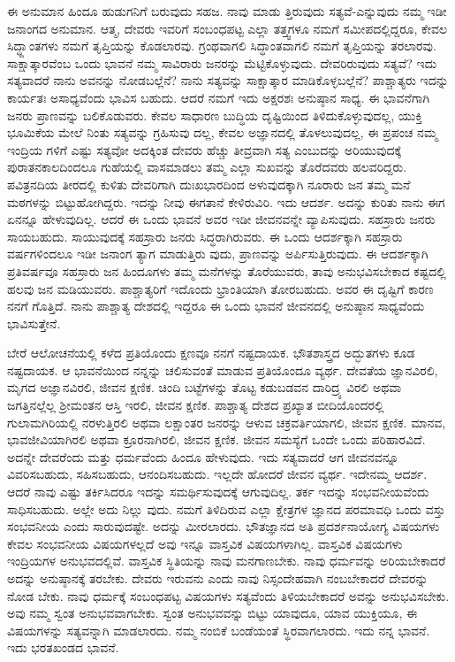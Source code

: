 ಈ ಅನುಮಾನ ಹಿಂದೂ ಹುಡುಗನಿಗೆ ಬರುವುದು ಸಹಜ. ನಾವು ಮಾಡು ತ್ತಿರುವುದು ಸತ್ಯವೆ-ಎನ್ನುವುದು ನಮ್ಮ ಇಡೀ ಜನಾಂಗದ ಅನುಮಾನ. ಆತ್ಮ, ದೇವರು ಇವರಿಗೆ ಸಂಬಂಧಪಟ್ಟ ಎಲ್ಲಾ ತತ್ತ್ವಗಳೂ ನಮಗೆ ಸಮೀಪದಲ್ಲಿದ್ದರೂ, ಕೇವಲ ಸಿದ್ಧ್ದಾಂತಗಳು ನಮಗೆ ತೃಪ್ತಿಯನ್ನು ಕೊಡಲಾರವು. ಗ್ರಂಥವಾಗಲಿ ಸಿದ್ಧಾಂತವಾಗಲಿ ನಮಗೆ ತೃಪ್ತಿಯನ್ನು ತರಲಾರವು. ಸಾಕ್ಷಾತ್ಕಾರವೆಂಬ ಒಂದು ಭಾವನೆ ನಮ್ಮ ಸಾವಿರಾರು ಜನರನ್ನು ಮೆಟ್ಟಿಕೊಳ್ಳುವುದು. ದೇವರಿರುವುದು ಸತ್ಯವೆ? ಇದು ಸತ್ಯವಾದರೆ ನಾನು ಅವನನ್ನು ನೋಡಬಲ್ಲೆನೆ? ನಾನು ಸತ್ಯವನ್ನು ಸಾಕ್ಷಾತ್ಕಾರ ಮಾಡಿಕೊಳ್ಳಬಲ್ಲೆನೆ? ಪಾಶ್ಚಾತ್ಯರು ಇದನ್ನು ಕಾರ್ಯತಃ ಅಸಾಧ್ಯವೆಂದು ಭಾವಿಸ ಬಹುದು. ಆದರೆ ನಮಗೆ ಇದು ಅಕ್ಷರಶಃ ಅನುಷ್ಠಾನ ಸಾಧ್ಯ. ಈ ಭಾವನೆಗಾಗಿ ಜನರು ಪ್ರಾಣವನ್ನು ಬಲಿಕೊಡುವರು. ಕೇವಲ ಸಾಧಾರಣ ಬುದ್ಧಿಯ ದೃಷ್ಟಿಯಿಂದ ತಿಳಿದುಕೊಳ್ಳುವುದಲ್ಲ, ಯುಕ್ತಿ ಭೂಮಿಕೆಯ ಮೇಲೆ ನಿಂತು ಸತ್ಯವನ್ನು ಗ್ರಹಿಸುವು ದಲ್ಲ, ಕೇವಲ ಅಜ್ಞಾನದಲ್ಲಿ ತೊಳಲುವುದಲ್ಲ, ಈ ಪ್ರಪಂಚ ನಮ್ಮ ಇಂದ್ರಿಯ ಗಳಿಗೆ ಎಷ್ಟು ಸತ್ಯವೋ ಅದಕ್ಕಿಂತ ದೇವರು ಹೆಚ್ಚು ತೀವ್ರವಾಗಿ ಸತ್ಯ ಎಂಬುದನ್ನು ಅರಿಯುವುದಕ್ಕೆ ಪುರಾತನಕಾಲದಿಂದಲೂ ಗುಹೆಯಲ್ಲಿ ವಾಸಮಾಡಲು ತಮ್ಮ ಎಲ್ಲಾ ಸುಖವನ್ನು ತೊರೆದವರು ಹಲವರಿದ್ದರು. ಪವಿತ್ರನದಿಯ ತೀರದಲ್ಲಿ ಕುಳಿತು ದೇವರಿಗಾಗಿ ದುಃಖಭಾರದಿಂದ ಅಳುವುದಕ್ಕಾಗಿ ನೂರಾರು ಜನ ತಮ್ಮ ಮನೆ ಮಠಗಳನ್ನು ಬಿಟ್ಟುಹೋಗಿದ್ದರು. ಇದನ್ನು ನೀವು ಈಗತಾನೆ ಕೇಳಿರುವಿರಿ. ಇದು ಆದರ್ಶ. ಅದನ್ನು ಕುರಿತು ನಾನು ಈಗ ಏನನ್ನೂ ಹೇಳುವುದಿಲ್ಲ. ಆದರೆ ಈ ಒಂದು ಭಾವನೆ ಅವರ ಇಡೀ ಜೀವನವನ್ನೇ ವ್ಯಾಪಿಸುವುದು. ಸಹಸ್ರಾರು ಜನರು ಸಾಯಬಹುದು. ಸಾಯುವುದಕ್ಕೆ ಸಹಸ್ರಾರು ಜನರು ಸಿದ್ಧರಾಗಿರುವರು. ಈ ಒಂದು ಆದರ್ಶಕ್ಕಾಗಿ ಸಹಸ್ರಾರು ವರ್ಷಗಳಿಂದಲೂ ಇಡೀ ಜನಾಂಗ ತ್ಯಾಗ ಮಾಡುತ್ತಿರು ವುದು, ಪ್ರಾಣವನ್ನು ಅರ್ಪಿಸುತ್ತಿರುವುದು. ಈ ಆದರ್ಶಕ್ಕಾಗಿ ಪ್ರತಿವರ್ಷವೂ ಸಹಸ್ರಾರು ಜನ ಹಿಂದೂಗಳು ತಮ್ಮ ಮನೆಗಳನ್ನು ತೊರೆಯುವರು, ತಾವು ಅನುಭವಿಸಬೇಕಾದ ಕಷ್ಟದಲ್ಲಿ ಹಲವು ಜನ ಮಡಿಯುವರು. ಪಾಶ್ಚಾತ್ಯರಿಗೆ ಇದೊಂದು ಭ್ರಾಂತಿಯಾಗಿ ತೋರಬಹುದು. ಅವರ ಈ ದೃಷ್ಟಿಗೆ ಕಾರಣ ನನಗೆ ಗೊತ್ತಿದೆ. ನಾನು ಪಾಶ್ಚಾತ್ಯ ದೇಶದಲ್ಲಿ ಇದ್ದರೂ ಈ ಒಂದು ಭಾವನೆ ಜೀವನದಲ್ಲಿ ಅನುಷ್ಠಾನ ಸಾಧ್ಯವೆಂದು ಭಾವಿಸುತ್ತೇನೆ.

ಬೇರೆ ಆಲೋಚನೆಯಲ್ಲಿ ಕಳೆದ ಪ್ರತಿಯೊಂದು ಕ್ಷಣವೂ ನನಗೆ ನಷ್ಟದಾಯಕ. ಭೌತಶಾಸ್ತ್ರದ ಅದ್ಭುತಗಳು ಕೂಡ ನಷ್ಟದಾಯಕ. ಆ ಭಾವನೆಯಿಂದ ನನ್ನನ್ನು ಚಲಿಸುವಂತೆ ಮಾಡುವ ಪ್ರತಿಯೊಂದೂ ವ್ಯರ್ಥ. ದೇವತೆಯ ಜ್ಞಾನವಿರಲಿ, ಮೃಗದ ಅಜ್ಞಾನವಿರಲಿ, ಜೀವನ ಕ್ಷಣಿಕ. ಚಿಂದಿ ಬಟ್ಟೆಗಳನ್ನು ತೊಟ್ಟ ಕಡುಬಡವನ ದಾರಿದ್ರ್ಯ ವಿರಲಿ ಅಥವಾ ಜಗತ್ತಿನಲ್ಲೆಲ್ಲ ಶ‍್ರೀಮಂತನ ಆಸ್ತಿ ಇರಲಿ, ಜೀವನ ಕ್ಷಣಿಕ. ಪಾಶ್ಚಾತ್ಯ ದೇಶದ ಪ್ರಖ್ಯಾತ ಬೀದಿಯೊಂದರಲ್ಲಿ ಗುಲಾಮಗಿರಿಯಲ್ಲಿ ನರಳುತ್ತಿರಲಿ ಅಥವಾ ಲಕ್ಷಾಂತರ ಜನರನ್ನು ಆಳುವ ಚಕ್ರವರ್ತಿಯಾಗಲಿ, ಜೀವನ ಕ್ಷಣಿಕ. ಮಾನವ, ಭಾವಜೀವಿಯಾಗಿರಲಿ ಅಥವಾ ಕ್ರೂರನಾಗಿರಲಿ, ಜೀವನ ಕ್ಷಣಿಕ. ಜೀವನ ಸಮಸ್ಯೆಗೆ ಒಂದೇ ಒಂದು ಪರಿಹಾರವಿದೆ. ಅದನ್ನೇ ದೇವರೆಂದು ಮತ್ತು ಧರ್ಮವೆಂದು ಹಿಂದೂ ಹೇಳುವುದು. ಇದು ಸತ್ಯವಾದರೆ ಆಗ ಜೀವನವನ್ನೂ ವಿವರಿಸಬಹುದು, ಸಹಿಸಬಹುದು, ಆನಂದಿಸಬಹುದು. ಇಲ್ಲದೇ ಹೋದರೆ ಜೀವನ ವ್ಯರ್ಥ. ಇದೇನಮ್ಮ ಆದರ್ಶ. ಆದರೆ ನಾವು ಎಷ್ಟು ತರ್ಕಿಸಿದರೂ ಇದನ್ನು ಸಮರ್ಥಿಸುವುದಕ್ಕೆ ಆಗುವುದಿಲ್ಲ. ತರ್ಕ ಇದನ್ನು ಸಂಭವನೀಯವೆಂದು ಸಾಧಿಸಬಹುದು. ಅಲ್ಲೇ ಅದು ನಿಲ್ಲು ವುದು. ನಮಗೆ ತಿಳಿದಿರುವ ಎಲ್ಲಾ ಕ್ಷೇತ್ರಗಳ ಜ್ಞಾನದ ಪರಮಾವಧಿ ಒಂದು ವಸ್ತು ಸಂಭವನೀಯ ಎಂದು ಸಾರುವುದಷ್ಟೇ. ಅದನ್ನು ಮೀರಲಾರದು. ಭೌತಜ್ಞಾನದ ಅತಿ ಪ್ರದರ್ಶನಾಯೋಗ್ಯ ವಿಷಯಗಳು ಕೇವಲ ಸಂಭವನೀಯ ವಿಷಯಗಳಲ್ಲದೆ ಅವು ಇನ್ನೂ ವಾಸ್ತವಿಕ ವಿಷಯಗಳಾಗಿಲ್ಲ. ವಾಸ್ತವಿಕ ವಿಷಯಗಳು ಇಂದ್ರಿಯಗಳ ಅನುಭವದಲ್ಲಿವೆ. ವಾಸ್ತವಿಕ ಸ್ಥಿತಿಯನ್ನು ನಾವು ಮನಗಾಣಬೇಕು. ನಾವು ಧರ್ಮವನ್ನು ಅರಿಯಬೇಕಾದರೆ ಅದನ್ನು ಅನುಷ್ಠಾನಕ್ಕೆ ತರಬೇಕು. ದೇವರು ಇರುವನು ಎಂದು ನಾವು ನಿಸ್ಸಂದೇಹವಾಗಿ ನಂಬಬೇಕಾದರೆ ದೇವರನ್ನು ನೋಡ ಬೇಕು. ನಾವು ಧರ್ಮಕ್ಕೆ ಸಂಬಂಧಪಟ್ಟ ವಿಷಯಗಳು ಸತ್ಯವೆಂದು ತಿಳಿಯಬೇಕಾದರೆ ಅವನ್ನು ಅನುಭವಿಸಬೇಕು. ಅವು ನಮ್ಮ ಸ್ವಂತ ಅನುಭವವಾಗಬೇಕು. ಸ್ವಂತ ಅನುಭವವನ್ನು ಬಿಟ್ಟು ಯಾವುದೂ, ಯಾವ ಯುಕ್ತಿಯೂ, ಈ ವಿಷಯಗಳನ್ನು ಸತ್ಯವನ್ನಾಗಿ ಮಾಡಲಾರದು. ನಮ್ಮ ನಂಬಿಕೆ ಬಂಡೆಯಂತೆ ಸ್ಥಿರವಾಗಲಾರದು. ಇದು ನನ್ನ ಭಾವನೆ. ಇದು ಭರತಖಂಡದ ಭಾವನೆ.

